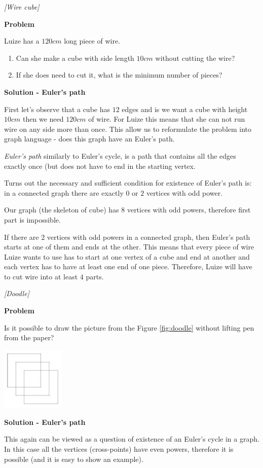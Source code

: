 \begin{problem}
\textit{[Wire cube]}

\textbf{Problem}

Luize has a $120cm$ long piece of wire.
\begin{enumerate}
\item Can she make a cube with side length $10cm$ without cutting the wire?
\item If she does need to cut it, what is the minimum number of pieces?
\end{enumerate}

\textbf{Solution - Euler's path}

First let's observe that a cube has $12$ edges and is we want a cube with height $10cm$ then we need $120cm$ of wire. For Luize this means that she can not run wire on any side more than once. 
This allow us to reformulate the problem into graph language - does this graph have an Euler's path. 

\textit{Euler's path} similarly to Euler's cycle, is a path that contains all the edges exactly once (but does not have to end in the starting vertex.

Turns out the necessary and sufficient condition for existence of Euler's path is: in a connected graph there are exactly $0$ or $2$ vertices with odd power. 

Our graph (the skeleton of cube) has $8$ vertices with odd powers, therefore first part is impossible. 

If there are $2$ vertices with odd powers in a connected graph, then Euler's path starts at one of them and ends at the other. This means that every piece of wire Luize wants to use has to start at one vertex of a cube and end at another and each vertex has to have at least one end of one piece. Therefore, Luize will have to cut wire into at least $4$ parts.

\end{problem}
%

\begin{problem}
\textit{[Doodle]}

\textbf{Problem}

Is it possible to draw the picture from the Figure \ref{fig:doodle} without lifting pen from the paper?
\begin{center}
\includegraphics[width=3cm]{doodle.png}
\label{fig:doodle}
\end{center} 

\textbf{Solution - Euler's path}

This again can be viewed as a question of existence of an Euler's cycle in a graph. In this case all the vertices (cross-points) have even powers, therefore it is possible (and it is easy to show an example).
\end{problem}
%


